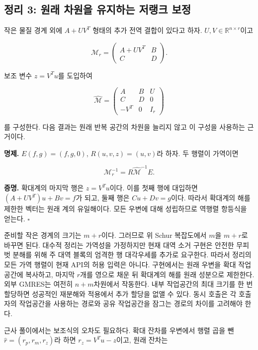 \documentclass[
  10pt,
  a4paper,
]{article}
\begin{document}
\hypertarget{uxc815uxb9ac-3-uxc6d0uxb798-uxcc28uxc6d0uxc744-uxc720uxc9c0uxd558uxb294-uxc800uxb7aduxd06c-uxbcf4uxc815}{%
\subsection{정리 3: 원래 차원을 유지하는 저랭크
보정}\label{uxc815uxb9ac-3-uxc6d0uxb798-uxcc28uxc6d0uxc744-uxc720uxc9c0uxd558uxb294-uxc800uxb7aduxd06c-uxbcf4uxc815}}

작은 물질 경계 외에 \(A+UV^T\) 형태의 추가 전역 결합이 있다고 하자.
\(U,V\in\mathbb R^{n\times r}\)이고

\[
\mathcal M_r=\begin{pmatrix}A+UV^T&B\\C&D\end{pmatrix}.
\]

보조 변수 \(z=V^Tu\)를 도입하여

\[
\widehat{\mathcal M}=
\begin{pmatrix}A&B&U\\C&D&0\\-V^T&0&I_r\end{pmatrix}
\]

를 구성한다. 다음 결과는 원래 반복 공간의 차원을 늘리지 않고 이 구성을
사용하는 근거이다.

\textbf{명제.} \(E(f,g)=(f,g,0)\), \(R(u,v,z)=(u,v)\)라 하자. 두 행렬이
가역이면

\[
\mathcal M_r^{-1}=R\widehat{\mathcal M}^{-1}E.
\]

\textbf{증명.} 확대계의 마지막 행은 \(z=V^Tu\)이다. 이를 첫째 행에
대입하면 \((A+UV^T)u+Bv=f\)가 되고, 둘째 행은 \(Cu+Dv=g\)이다. 따라서
확대계의 해를 제한한 벡터는 원래 계의 유일해이다. 모든 우변에 대해
성립하므로 역행렬 항등식을 얻는다. \(\square\)

준비할 작은 경계의 크기는 \(m+r\)이다. 그러므로 위 Schur 복잡도에서
\(m\)을 \(m+r\)로 바꾸면 된다. 대수적 정리는 가역성을 가정하지만 현재
대역 소거 구현은 안전한 무피벗 분해를 위해 주 대역 블록의 엄격한 행
대각우세를 추가로 요구한다. 따라서 정리의 모든 가역 행렬이 현재 API의
허용 입력은 아니다. 구현에서는 원래 우변을 확대 작업공간에 복사하고,
마지막 \(r\)개를 영으로 채운 뒤 확대계의 해를 원래 성분으로 제한한다.
외부 GMRES는 여전히 \(n+m\)차원에서 작동한다. 내부 작업공간의 최대
크기를 한 번 할당하면 성공적인 재분해와 적용에서 추가 할당을 없앨 수
있다. 동시 호출은 각 호출자의 작업공간을 사용하는 경로와 공유 작업공간을
잠그는 경로의 차이를 고려해야 한다.

근사 풀이에서는 보조식의 오차도 필요하다. 확대 잔차를 우변에서 행렬 곱을
뺀 \(\widehat r=(r_p,r_m,r_z)\)라 하면 \(r_z=V^Tu-z\)이고, 원래 잔차는
\end{document}
